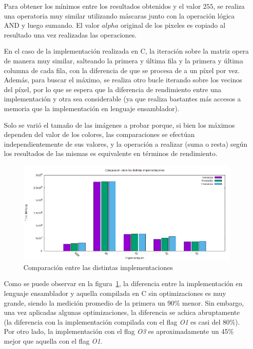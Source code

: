 \documentclass[a4paper]{article}
\begin{document}
Para obtener los mínimos entre los resultados obtenidos y el valor $255$, se realiza una operatoria muy similar utilizando máscaras junto con la operación lógica AND y luego sumando. El valor $alpha$ original de los pixeles es copiado al resultado una vez realizadas las operaciones.
\bigskip

En el caso de la implementación realizada en C, la iteración sobre la matriz opera de manera muy similar, salteando la primera y última fila y la primera y última columna de cada fila, con la diferencia de que se procesa de a un píxel por vez. Además, para buscar el máximo, se realiza otro bucle iterando sobre los vecinos del píxel, por lo que se espera que la diferencia de rendimiento entre una implementación y otra sea considerable (ya que realiza bastantes más accesos a memoria que la implementación en lenguaje ensamblador).

Solo se varió el tamaño de las imágenes a probar porque, si bien los máximos dependen del valor de los colores, las comparaciones se efectúan independientemente de sus valores, y la operación a realizar (suma o resta) según los resultados de las mismas es equivalente en términos de rendimiento.
\\
\begin{figure}[H]
  \begin{center}
	\includegraphics[scale=0.6]{imagenes/colorizarC.png}
	\caption{Comparación entre las distintas implementaciones}
	\label{colorizar_asmvsc}
  \end{center}
\end{figure}

Como se puede observar en la figura~\ref{colorizar_asmvsc}, la diferencia entre la implementación en lenguaje ensamblador y aquella compilada en C sin optimizaciones es muy grande, siendo la medición promedio de la primera un 90\% menor. Sin embargo, una vez aplicadas algunas optimizaciones, la diferencia se achica abruptamente (la diferencia con la implementación compilada con el flag \textit{O1} es casi del 80\%). Por otro lado, la implementación con el flag \textit{O3} es aproximadamente un 45\% mejor que aquella con el flag \textit{O1}.
\end{document}
